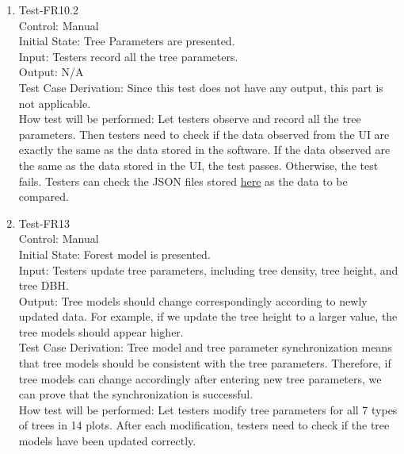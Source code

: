 \documentclass[12pt, titlepage]{article}
\begin{document}
\begin{enumerate}
\item{Test-FR10.2\\}
Control: Manual\\ 

Initial State: Tree Parameters are presented.\\

Input: Testers record all the tree parameters.\\

Output: N/A\\

Test Case Derivation: Since this test does not have any output, this 
part is not applicable.\\
					
How test will be performed: Let testers observe and record all the 
tree parameters. Then testers need to check if the data observed
from the UI are exactly the same as the data stored in the software. 
If the data observed are the same as the data stored in the UI, 
the test passes. Otherwise, the test fails. Testers can check the JSON
files stored \href{https://github.com/tingyushi/DTForest-DS}{here}
as the data to be compared. 

\item{Test-FR13\\}
Control: Manual\\ 

Initial State: Forest model is presented.\\

Input: Testers update tree parameters, including tree density, tree
height, and tree DBH.\\

Output: Tree models should change correspondingly according to newly
updated data. For example, if we update the tree height to a larger
value, the tree models should appear higher.\\

Test Case Derivation: Tree model and tree parameter synchronization
means that tree  models should be consistent with the tree parameters.
Therefore, if tree models can change accordingly after  entering 
new tree parameters, we can prove that the synchronization is 
successful.\\
					
How test will be performed: Let testers modify tree parameters for 
all 7 types of trees in 14 plots. After each modification, testers need
to check if the tree models have been updated correctly.


\end{enumerate}
\end{document}
